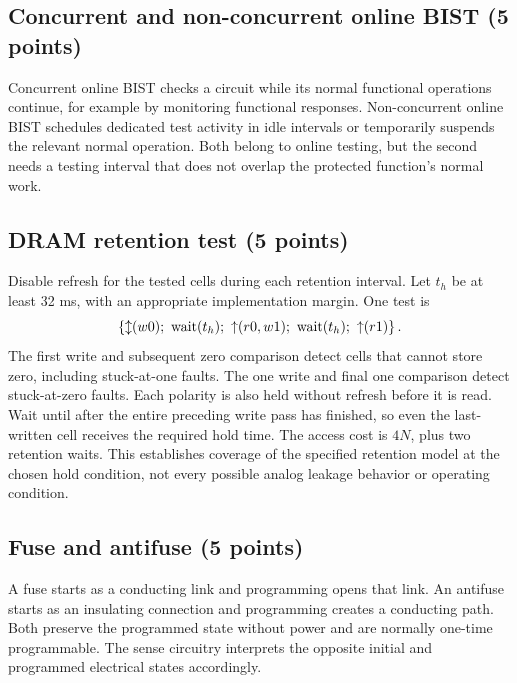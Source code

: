 \subsection{Concurrent and non-concurrent online BIST (5 points)}
\answer Concurrent online BIST checks a circuit while its normal functional operations continue, for example by monitoring functional responses. Non-concurrent online BIST schedules dedicated test activity in idle intervals or temporarily suspends the relevant normal operation. Both belong to online testing, but the second needs a testing interval that does not overlap the protected function's normal work.

\subsection{DRAM retention test (5 points)}
\answer Disable refresh for the tested cells during each retention interval. Let $t_h$ be at least 32 ms, with an appropriate implementation margin. One test is
\[
\march{\any(w0);\ \mathrm{wait}(t_h);\ \up(r0,w1);\ \mathrm{wait}(t_h);\ \up(r1)}.
\]
The first write and subsequent zero comparison detect cells that cannot store zero, including stuck-at-one faults. The one write and final one comparison detect stuck-at-zero faults. Each polarity is also held without refresh before it is read. Wait until after the entire preceding write pass has finished, so even the last-written cell receives the required hold time. The access cost is $4N$, plus two retention waits. This establishes coverage of the specified retention model at the chosen hold condition, not every possible analog leakage behavior or operating condition.

\subsection{Fuse and antifuse (5 points)}
\answer A fuse starts as a conducting link and programming opens that link. An antifuse starts as an insulating connection and programming creates a conducting path. Both preserve the programmed state without power and are normally one-time programmable. The sense circuitry interprets the opposite initial and programmed electrical states accordingly.

